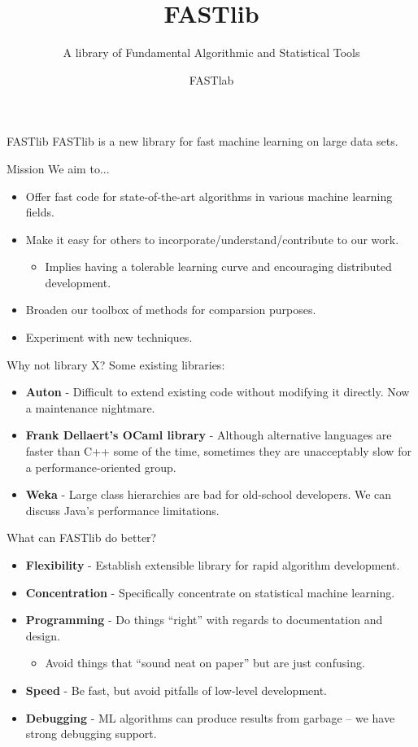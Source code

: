 \documentclass[pdf,colorBG,slideColor]{prosper}
\title{FASTlib}
\subtitle{A library of Fundamental Algorithmic and Statistical Tools}
\author{FASTlab}
\newcommand{\itemt}[1]{\item {\bf #1} -}
\begin{document}
\maketitle

\begin{slide}{FASTlib}
 \vspace*{.6in}
 FASTlib is a new library for fast machine learning on large data sets.
\end{slide}

\begin{slide}{Mission}
 We aim to...
 \\
 \begin{itemize}
  \item Offer fast code for state-of-the-art algorithms in various machine learning fields.
  \item Make it easy for others to incorporate/understand/contribute to our work.
  \begin{itemize}
    \item Implies having a tolerable learning curve and encouraging distributed development.
  \end{itemize}
  \item Broaden our toolbox of methods for comparsion purposes.
  \item Experiment with new techniques.
 \end{itemize}
\end{slide}

\begin{slide}{Why not library X?}
 Some existing libraries:
 \begin{itemize}
  \itemt{Auton} Difficult to extend existing code without modifying it directly.
  Now a maintenance nightmare.
  \itemt{Frank Dellaert's OCaml library}
  Although alternative languages are faster than C++ some of the time,
  sometimes they are unacceptably slow for a performance-oriented group.
  \itemt{Weka} Large class hierarchies are bad for old-school developers.
  We can discuss Java's performance limitations.
 \end{itemize}
\end{slide}

\begin{slide}{What can FASTlib do better?}
 \begin{itemize}
  \itemt{Flexibility} Establish extensible library for rapid algorithm development.
  \itemt{Concentration} Specifically concentrate on statistical machine learning.
  \itemt{Programming} Do things ``right'' with regards to documentation and design.
  \begin{itemize}
    \item Avoid things that ``sound neat on paper'' but are just confusing.
  \end{itemize}
  \itemt{Speed} Be fast, but avoid pitfalls of low-level development.
  \itemt{Debugging} ML algorithms can produce results from garbage -- we have strong debugging support.
 \end{itemize}
\end{slide}
\end{document}
